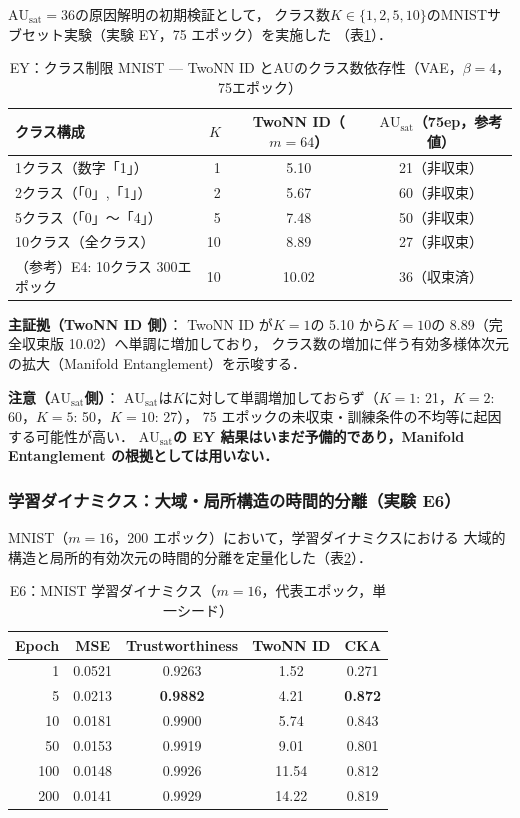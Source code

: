 \documentclass[11pt,a4paper]{jsarticle}
\newcommand{\AUsat}{\mathrm{AU}_{\mathrm{sat}}}
\begin{document}
$\AUsat = 36$の原因解明の初期検証として，
クラス数$K \in \{1, 2, 5, 10\}$のMNISTサブセット実験（実験 EY，75 エポック）を実施した
（表\ref{tab:ey}）．

\begin{table}[H]
\centering
\caption{EY：クラス制限 MNIST — TwoNN ID とAUのクラス数依存性（VAE，$\beta=4$，75エポック）}
\label{tab:ey}
\small
\begin{tabular}{lrcc}
\toprule
クラス構成 & $K$ & TwoNN ID（$m=64$） & $\AUsat$（75ep，参考値） \\
\midrule
1クラス（数字「1」） & 1  & 5.10 & 21（非収束） \\
2クラス（「0」,「1」） & 2  & 5.67 & 60（非収束） \\
5クラス（「0」〜「4」）& 5  & 7.48 & 50（非収束） \\
10クラス（全クラス）  & 10 & 8.89 & 27（非収束） \\
\midrule
（参考）E4: 10クラス 300エポック & 10 & 10.02 & 36（収束済） \\
\bottomrule
\end{tabular}
\end{table}

\textbf{主証拠（TwoNN ID 側）}：
TwoNN ID が$K = 1$の 5.10 から$K = 10$の 8.89（完全収束版 10.02）へ単調に増加しており，
クラス数の増加に伴う有効多様体次元の拡大（Manifold Entanglement）を示唆する．

\textbf{注意（$\AUsat$側）}：
$\AUsat$は$K$に対して単調増加しておらず（$K=1$: 21，$K=2$: 60，$K=5$: 50，$K=10$: 27），
75 エポックの未収束・訓練条件の不均等に起因する可能性が高い．
\textbf{$\AUsat$の EY 結果はいまだ予備的であり，Manifold Entanglement の根拠としては用いない．}

\subsubsection{学習ダイナミクス：大域・局所構造の時間的分離（実験 E6）}

MNIST（$m = 16$，200 エポック）において，学習ダイナミクスにおける
大域的構造と局所的有効次元の時間的分離を定量化した（表\ref{tab:e6}）．

\begin{table}[H]
\centering
\caption{E6：MNIST 学習ダイナミクス（$m=16$，代表エポック，単一シード）}
\label{tab:e6}
\small
\begin{tabular}{rcccc}
\toprule
Epoch & MSE & Trustworthiness & TwoNN ID & CKA \\
\midrule
1   & 0.0521 & 0.9263 & 1.52 & 0.271 \\
5   & 0.0213 & \textbf{0.9882} & 4.21 & \textbf{0.872} \\
10  & 0.0181 & 0.9900 & 5.74 & 0.843 \\
50  & 0.0153 & 0.9919 & 9.01 & 0.801 \\
100 & 0.0148 & 0.9926 & 11.54 & 0.812 \\
200 & 0.0141 & 0.9929 & 14.22 & 0.819 \\
\bottomrule
\end{tabular}
\end{table}
\end{document}
